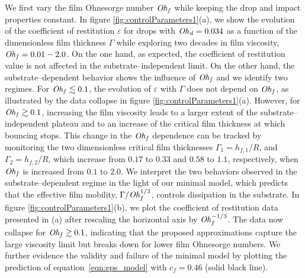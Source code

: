 We first vary the film Ohnesorge number $\mathit{Oh}_\mathit{f}$ while keeping the drop and impact properties constant. In figure \ref{fig:controlParameters1}(a), we show the evolution of the coefficient of restitution $\varepsilon$ for drops with $\mathit{Oh}_\mathit{d} = 0.034$ as a function of the dimensionless film thickness $\Gamma$ while exploring two decades in film viscosity, $\mathit{Oh}_\mathit{f} = 0.01 - 2.0$. On the one hand, as expected, the coefficient of restitution value is not affected in the substrate--independent limit. On the other hand, the substrate--dependent behavior shows the influence of $\mathit{Oh}_\mathit{f}$ and we identify two regimes. For $\mathit{Oh}_\mathit{f} \lesssim 0.1$, the evolution of $\varepsilon$ with $\Gamma$ does not depend on $\mathit{Oh}_\mathit{f}$, as illustrated by the data collapse in figure \ref{fig:controlParameters1}(a). However, for $\mathit{Oh}_\mathit{f} \gtrsim 0.1$, increasing the film viscosity leads to a larger extent of the substrate--independent plateau and to an increase of the critical film thickness at which bouncing stops. This change in the $\mathit{Oh}_\mathit{f}$ dependence can be tracked by monitoring the two dimensionless critical film thicknesses $\Gamma_1 = h_{f,1}/R$, and $\Gamma_2 = h_{f,2}/R$, which increase from $0.17$ to $0.33$ and $0.58$ to $1.1$, respectively, when $\mathit{Oh}_\mathit{f}$ is increased from $0.1$ to $2.0$. We interpret the two behaviors observed in the substrate--dependent regime in the light of our minimal model, which predicts that the effective film mobility, $\Gamma/\mathit{Oh}_\mathit{f}^{1/3}$, controls dissipation in the substrate. 
In figure \ref{fig:controlParameters1}(b), we plot the coefficient of restitution data presented in (a) after rescaling the horizontal axis by $\mathit{Oh}_\mathit{f}^{-1/3}$. 
The data now collapse for $\mathit{Oh}_\mathit{f} \gtrsim 0.1$, indicating that the proposed approximations capture the large viscosity limit but breaks down for lower film Ohnesorge numbers. We further evidence the validity and failure of the minimal model by plotting the prediction of equation~\eqref{eqn:eps_model} with $c_f = 0.46$ (solid black line).

